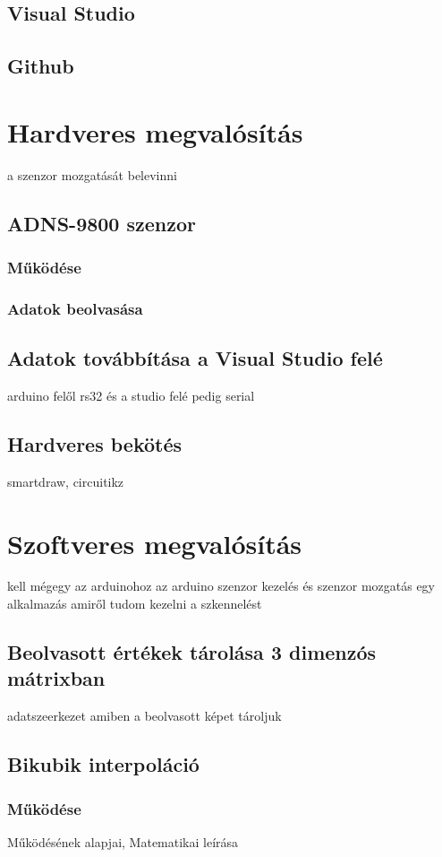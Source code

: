 \documentclass[]{thesis-ekf}
\theoremstyle{definition}
\theoremstyle{remark}
\begin{document}
\section{Visual Studio}
\section{Github}
\chapter{Hardveres megvalósítás}
a szenzor mozgatását belevinni
\section{ADNS-9800 szenzor}
\subsection{Működése}
\subsection{Adatok beolvasása}
\section{Adatok továbbítása a Visual Studio felé}
arduino felől rs32 és a studio felé pedig serial
\section{Hardveres bekötés}
smartdraw, circuitikz
\chapter{Szoftveres megvalósítás}
kell mégegy az arduinohoz az arduino szenzor kezelés és szenzor mozgatás
egy alkalmazás amiről tudom kezelni a szkennelést
\section{Beolvasott értékek tárolása 3 dimenzós mátrixban}
adatszeerkezet amiben a beolvasott képet tároljuk
\section{Bikubik interpoláció}
\subsection{Működése}
Működésének alapjai, Matematikai leírása
\end{document}
